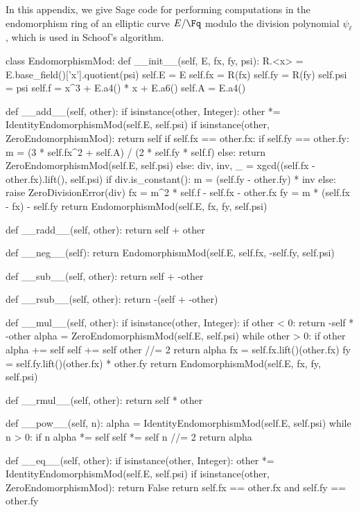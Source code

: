 In this appendix, we give Sage code for performing computations in the endomorphism ring of an elliptic curve $E / \Fq$ modulo the division polynomial $\psi_\ell$, which is used in Schoof's algorithm.

\begin{sagecode}
class EndomorphismMod:
    def __init__(self, E, fx, fy, psi):
        R.<x> = E.base_field()['x'].quotient(psi)
        self.E = E
        self.fx = R(fx)
        self.fy = R(fy)
        self.psi = psi
        self.f = x^3 + E.a4() * x + E.a6()
        self.A = E.a4()

    def __add__(self, other):
        if isinstance(other, Integer):
            other *= IdentityEndomorphismMod(self.E, self.psi)
        if isinstance(other, ZeroEndomorphismMod):
            return self
        if self.fx == other.fx:
            if self.fy == other.fy:
                m = (3 * self.fx^2 + self.A) / (2 * self.fy * self.f)
            else:
                return ZeroEndomorphismMod(self.E, self.psi)
        else:
            div, inv, _ = xgcd((self.fx - other.fx).lift(), self.psi)
            if div.is_constant():
                m = (self.fy - other.fy) * inv
            else:
                raise ZeroDivisionError(div)
        fx = m^2 * self.f - self.fx - other.fx
        fy = m * (self.fx - fx) - self.fy
        return EndomorphismMod(self.E, fx, fy, self.psi)

    def __radd__(self, other):
        return self + other

    def __neg__(self):
        return EndomorphismMod(self.E, self.fx, -self.fy, self.psi)

    def __sub__(self, other):
        return self + -other

    def __rsub__(self, other):
        return -(self + -other)

    def __mul__(self, other):
        if isinstance(other, Integer):
            if other < 0:
                return -self * -other
            alpha = ZeroEndomorphismMod(self.E, self.psi)
            while other > 0:
                if other %
                    alpha += self
                self += self
                other //= 2
            return alpha
        fx = self.fx.lift()(other.fx)
        fy = self.fy.lift()(other.fx) * other.fy
        return EndomorphismMod(self.E, fx, fy, self.psi)

    def __rmul__(self, other):
        return self * other

    def __pow__(self, n):
        alpha = IdentityEndomorphismMod(self.E, self.psi)
        while n > 0:
            if n %
                alpha *= self
            self *= self
            n //= 2
        return alpha

    def __eq__(self, other):
        if isinstance(other, Integer):
            other *= IdentityEndomorphismMod(self.E, self.psi)
        if isinstance(other, ZeroEndomorphismMod):
            return False
        return self.fx == other.fx and self.fy == other.fy
\end{sagecode}

